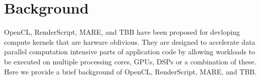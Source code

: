 \section{Background}
\label{sec:background}

OpenCL, RenderScript, MARE, and TBB have been proposed for devloping compute kernels that
are harware oblivious.
They are designed to accelerate data parallel computation intensive parts of application
code by allowing workloads to be executed on multiple processing cores, GPUs,
DSPs or a combination of these. Here we provide a brief background of OpenCL,
RenderScript, MARE, and TBB.





